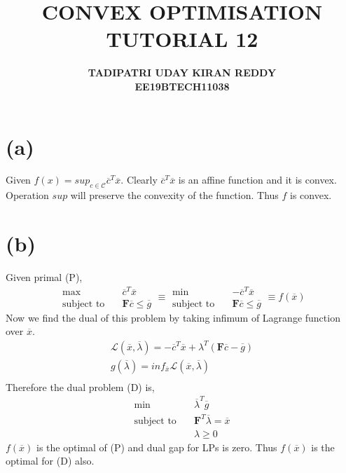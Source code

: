 \documentclass{article}
\begin{document}
\title{\textbf{CONVEX OPTIMISATION}\\{\textbf{TUTORIAL 12
}}}
\author{\textbf{TADIPATRI UDAY KIRAN REDDY}\\\textbf{EE19BTECH11038}}
\maketitle

\section*{(a)}
Given $f(x) = sup_{c \in \mathcal{C}}\overline{c}^T\overline{x}$. Clearly $\overline{c}^T\overline{x}$ is an affine function and it is convex. Operation $sup$ will preserve the convexity of the function. Thus $f$ is convex.
\section*{(b)}
Given primal (P),
\begin{equation*}
	\begin{aligned}
		\max \quad & \overline{c}^T\overline{x}\\
		\textrm{subject to} \quad & \mathbf{F}\overline{c} \le \overline{g}
	\end{aligned}
	\equiv 
	\begin{aligned}
		\min \quad & -\overline{c}^T\overline{x}\\
		\textrm{subject to} \quad & \mathbf{F}\overline{c} \le \overline{g}
	\end{aligned}
	\equiv f(\overline{x})
\end{equation*}
Now we find the dual of this problem by taking infimum of Lagrange function over $\overline{x}$.
\begin{gather*}
	\mathcal{L}(\overline{x}, \overline{\lambda}) =  -\overline{c}^T\overline{x} + \lambda ^T\left(\mathbf{F}\overline{c} - \overline{g}\right)\\
	g(\overline{\lambda}) = inf_{\overline{x}}\mathcal{L}(\overline{x}, \overline{\lambda})\\
\end{gather*}
Therefore the dual problem (D) is,
\begin{equation*}
	\begin{aligned}
		\min \quad & \overline{\lambda}^T\overline{g}\\
		\textrm{subject to} \quad & \mathbf{F}^T\overline{\lambda} = \overline{x}\\
		& \lambda \ge 0
	\end{aligned}
\end{equation*}
$f(\overline{x})$ is the optimal of (P) and dual gap for LPs is zero. Thus $f(\overline{x})$ is the optimal for (D) also.
\end{document}
